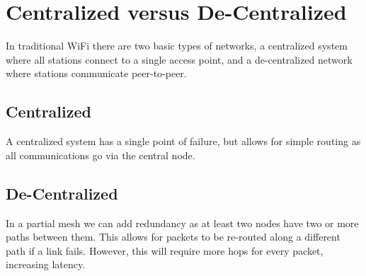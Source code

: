 \section{Centralized versus De-Centralized}
In traditional WiFi there are two basic types of networks, a
centralized system where all stations connect
to a single access point, and a de-centralized
network where stations communicate peer-to-peer.

\subsection{Centralized}
A centralized system has a single point of failure, but allows
for simple routing as all communications go via the central
node.

\subsection{De-Centralized}
In a partial mesh we can add redundancy as at least two
nodes have two or more paths between them. This allows for packets
to be re-routed along a different path if a link fails. However, this
will require more hops for every packet, increasing latency.
